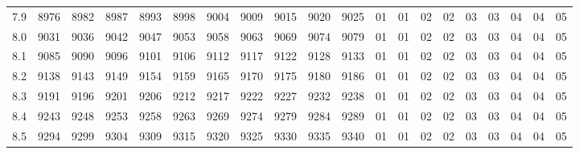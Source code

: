 \documentclass[12pt,UTF8]{ctexbook}
\begin{document}
\begin{appendix}
\begin{longtable}{|c| c c c c c | c c c c c| c c c c c c c c c|}
\scriptsize 7.9 & \scriptsize 8976 & \scriptsize 8982 & \scriptsize 8987 & \scriptsize 8993 & \scriptsize 8998 & \scriptsize 9004 & \scriptsize 9009 & \scriptsize 9015 & \scriptsize 9020 & \scriptsize 9025 & \scriptsize 01 & \scriptsize 01 & \scriptsize 02 & \scriptsize 02 & \scriptsize 03 & \scriptsize 03 & \scriptsize 04 & \scriptsize 04 & \scriptsize 05 \\
\scriptsize 8.0 & \scriptsize 9031 & \scriptsize 9036 & \scriptsize 9042 & \scriptsize 9047 & \scriptsize 9053 & \scriptsize 9058 & \scriptsize 9063 & \scriptsize 9069 & \scriptsize 9074 & \scriptsize 9079 & \scriptsize 01 & \scriptsize 01 & \scriptsize 02 & \scriptsize 02 & \scriptsize 03 & \scriptsize 03 & \scriptsize 04 & \scriptsize 04 & \scriptsize 05 \\
\scriptsize 8.1 & \scriptsize 9085 & \scriptsize 9090 & \scriptsize 9096 & \scriptsize 9101 & \scriptsize 9106 & \scriptsize 9112 & \scriptsize 9117 & \scriptsize 9122 & \scriptsize 9128 & \scriptsize 9133 & \scriptsize 01 & \scriptsize 01 & \scriptsize 02 & \scriptsize 02 & \scriptsize 03 & \scriptsize 03 & \scriptsize 04 & \scriptsize 04 & \scriptsize 05 \\
\scriptsize 8.2 & \scriptsize 9138 & \scriptsize 9143 & \scriptsize 9149 & \scriptsize 9154 & \scriptsize 9159 & \scriptsize 9165 & \scriptsize 9170 & \scriptsize 9175 & \scriptsize 9180 & \scriptsize 9186 & \scriptsize 01 & \scriptsize 01 & \scriptsize 02 & \scriptsize 02 & \scriptsize 03 & \scriptsize 03 & \scriptsize 04 & \scriptsize 04 & \scriptsize 05 \\
\scriptsize 8.3 & \scriptsize 9191 & \scriptsize 9196 & \scriptsize 9201 & \scriptsize 9206 & \scriptsize 9212 & \scriptsize 9217 & \scriptsize 9222 & \scriptsize 9227 & \scriptsize 9232 & \scriptsize 9238 & \scriptsize 01 & \scriptsize 01 & \scriptsize 02 & \scriptsize 02 & \scriptsize 03 & \scriptsize 03 & \scriptsize 04 & \scriptsize 04 & \scriptsize 05 \\
\scriptsize 8.4 & \scriptsize 9243 & \scriptsize 9248 & \scriptsize 9253 & \scriptsize 9258 & \scriptsize 9263 & \scriptsize 9269 & \scriptsize 9274 & \scriptsize 9279 & \scriptsize 9284 & \scriptsize 9289 & \scriptsize 01 & \scriptsize 01 & \scriptsize 02 & \scriptsize 02 & \scriptsize 03 & \scriptsize 03 & \scriptsize 04 & \scriptsize 04 & \scriptsize 05 \\
\scriptsize 8.5 & \scriptsize 9294 & \scriptsize 9299 & \scriptsize 9304 & \scriptsize 9309 & \scriptsize 9315 & \scriptsize 9320 & \scriptsize 9325 & \scriptsize 9330 & \scriptsize 9335 & \scriptsize 9340 & \scriptsize 01 & \scriptsize 01 & \scriptsize 02 & \scriptsize 02 & \scriptsize 03 & \scriptsize 03 & \scriptsize 04 & \scriptsize 04 & \scriptsize 05 \\

\end{longtable}
\end{appendix}
\end{document}

